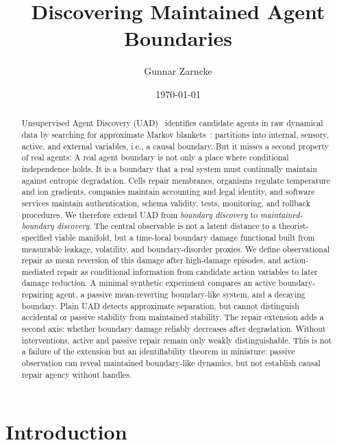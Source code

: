 \documentclass[11pt]{article}
\title{Discovering Maintained Agent Boundaries}
\author{Gunnar Zarncke}
\date{\today}
\begin{document}
\maketitle

\begin{abstract}
Unsupervised Agent Discovery (UAD)~\cite{uad2025} identifies candidate agents in raw dynamical data by searching for approximate Markov blankets~\cite{friston2010free,kirchhoff2018markov}: partitions into internal, sensory, active, and external variables, i.e., a causal boundary. 
But it misses a second property of real agents: A real agent boundary is not only a place where conditional independence holds. 
It is a boundary that a real system must continually maintain against entropic degradation. 
Cells repair membranes, organisms regulate temperature and ion gradients, companies maintain accounting and legal identity, and software services maintain authentication, schema validity, tests, monitoring, and rollback procedures. 
We therefore extend UAD from \emph{boundary discovery} to \emph{maintained-boundary discovery}. 
The central observable is not a latent distance to a theorist-specified viable manifold, but a time-local boundary damage functional built from measurable leakage, volatility, and boundary-disorder proxies. 
We define observational repair as mean reversion of this damage after high-damage episodes, and action-mediated repair as conditional information from candidate action variables to later damage reduction. 
A minimal synthetic experiment compares an active boundary-repairing agent, a passive mean-reverting boundary-like system, and a decaying boundary. 
Plain UAD detects approximate separation, but cannot distinguish accidental or passive stability from maintained stability. 
The repair extension adds a second axis: whether boundary damage reliably decreases after degradation. 
Without interventions, active and passive repair remain only weakly distinguishable. 
This is not a failure of the extension but an identifiability theorem in miniature: passive observation can reveal maintained boundary-like dynamics, but not establish causal repair agency without handles.
\end{abstract}

\section{Introduction}
\end{document}

